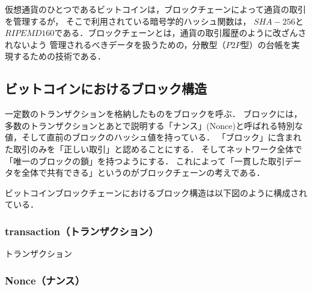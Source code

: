 \documentclass[a4paper,12pt]{jsarticle}
\begin{document}
仮想通貨のひとつであるビットコインは，ブロックチェーンによって通貨の取引を管理するが，
そこで利用されている暗号学的ハッシュ関数は，
$SHA-256$と$RIPEMD160$である．ブロックチェーンとは，通貨の取引履歴のように改ざんされないよう
管理されるべきデータを扱うための，分散型（$P2P$型）の台帳を実現するための技術である．





      \subsection{ビットコインにおけるブロック構造}
一定数のトランザクションを格納したものをブロックを呼ぶ．
ブロックには，多数のトランザクションとあとで説明する「ナンス」(Nonce)と呼ばれる特別な値，そして直前のブロックのハッシュ値を持っている．
「ブロック」に含まれた取引のみを「正しい取引」と認めることにする．
そしてネットワーク全体で「唯一のブロックの鎖」を持つようにする．
これによって「一貫した取引データを全体で共有できる」というのがブロックチェーンの考えである．%

ビットコインブロックチェーンにおけるブロック構造は以下図のように構成されている．


            \subsubsection{transaction（トランザクション）}
トランザクション
            \subsubsection{Nonce（ナンス）}
\end{document}

